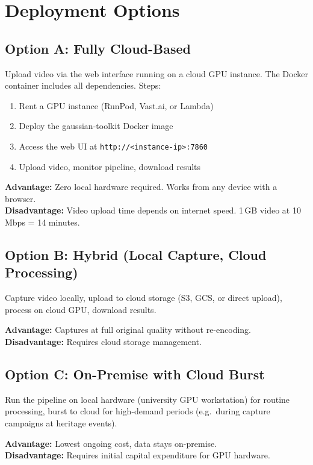 \section{Deployment Options}

\subsection{Option A: Fully Cloud-Based}

Upload video via the web interface running on a cloud GPU instance. The Docker container includes all dependencies. Steps:

\begin{enumerate}
  \item Rent a GPU instance (RunPod, Vast.ai, or Lambda)
  \item Deploy the gaussian-toolkit Docker image
  \item Access the web UI at \texttt{http://\textless instance-ip\textgreater:7860}
  \item Upload video, monitor pipeline, download results
\end{enumerate}

\textbf{Advantage:} Zero local hardware required. Works from any device with a browser.\\
\textbf{Disadvantage:} Video upload time depends on internet speed. 1\,GB video at 10\,Mbps = 14 minutes.

\subsection{Option B: Hybrid (Local Capture, Cloud Processing)}

Capture video locally, upload to cloud storage (S3, GCS, or direct upload), process on cloud GPU, download results.

\textbf{Advantage:} Captures at full original quality without re-encoding.\\
\textbf{Disadvantage:} Requires cloud storage management.

\subsection{Option C: On-Premise with Cloud Burst}

Run the pipeline on local hardware (university GPU workstation) for routine processing, burst to cloud for high-demand periods (e.g.\ during capture campaigns at heritage events).

\textbf{Advantage:} Lowest ongoing cost, data stays on-premise.\\
\textbf{Disadvantage:} Requires initial capital expenditure for GPU hardware.

